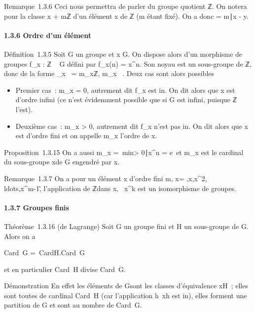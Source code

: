 \documentclass[]{article}
\begin{document}
Remarque~1.3.6 Ceci nous permettra de parler du groupe quotient ℤ. On
notera \overlinex pour la classe x + mℤ d'un élément
x de ℤ (m étant fixé). On a donc \overlinex =
\overliney \Leftrightarrow
m∣x - y.

\paragraph{1.3.6 Ordre d'un élément}

Définition~1.3.5 Soit G un groupe et x \in G. On dispose alors d'un
morphisme de groupes f\_x : ℤ \rightarrow~ G défini par f\_x(n) =
x^n. Son noyau est un sous-groupe de ℤ, donc de la forme
\mathrmKerf\_x~ =
m\_xℤ, m\_x \in {}~. Deux cas sont alors possibles

\begin{itemize}
\itemsep1pt\parskip0pt
\item
  Premier cas~: m\_x = 0, autrement dit f\_x est
  in\jmathectif. On dit alors que x est d'ordre infini (ce n'est évidemment
  possible que si G est infini, puisque ℤ l'est).
\item
  Deuxième cas~: m\_x \textgreater{} 0, autrement dit
  f\_x n'est pas in\jmathectif. On dit alors que x est d'ordre fini
  et on appelle m\_x l'ordre de x.
\end{itemize}

Proposition~1.3.15 On a aussi m\_x =\
min\n \textgreater{}
0∣x^n = e\ et
m\_x est le cardinal du sous-groupe \langle
x\rangle de G engendré par x.

Remarque~1.3.7 On a pour un élément x d'ordre fini m,
\langle x\rangle =
\e,x,x^2,\\ldots,x^m-1\~,
l'application de ℤ dans \langle
x\rangle ,
\overlinek\mapsto~x^k
est un isomorphisme de groupes.

\paragraph{1.3.7 Groupes finis}

Théorème~1.3.16 (de Lagrange) Soit G un groupe fini et H un sous-groupe
de G. Alors on a

Card~G =\
CardH.Card~G\diagupH

et en particulier Card~H divise
Card~G.

Démonstration En effet les éléments de G\diagupH sont les classes
d'équivalence xH~; elles sont toutes de cardinal
Card~H (car l'application
h\mapsto~xh est in\jmathective), elles forment une
partition de G et sont au nombre de Card~G\diagupH.
\end{document}
